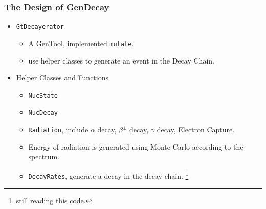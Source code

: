 \begin{frame}
    \frametitle{The Design of GenDecay}
    \begin{itemize}
        \item {\tt GtDecayerator}
            \begin{itemize}
                \item A GenTool, implemented {\tt mutate}.
                \item use helper classes to generate an event in the Decay
                    Chain.
            \end{itemize}
        \item Helper Classes and Functions
            \begin{itemize}
                \item {\tt NucState}
                \item {\tt NucDecay}
                \item {\tt Radiation}, include $\alpha$ decay, $\beta^\pm$
                    decay, $\gamma$ decay, Electron Capture.
                \item Energy of radiation is generated using Monte Carlo
                    according to the spectrum.
                \item {\tt DecayRates}, generate a decay in the decay chain.
                    \footnote{still reading this code.}
            \end{itemize}
    \end{itemize}
\end{frame}
